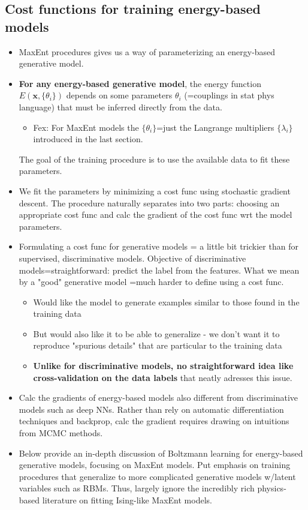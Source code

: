\documentclass[norsk,a4paper,11pt]{article}
\begin{document}
\subsection{Cost functions for training energy-based models}
\begin{itemize}
	\item MaxEnt procedures gives us a way of parameterizing an energy-based generative model.
	\item \textbf{For any energy-based generative model}, the energy function $E(\bm{x}, \{ \theta_i \})$ depends on some parameters $\theta_i$ (=couplings in stat phys language) that must be inferred directly from the data.
	\begin{itemize}
		\item Fex: For MaxEnt models the $\{ \theta_i \}$=just the Langrange multipliers $\{ \lambda_i \}$ introduced in the last section.
	\end{itemize}
	The goal of the training procedure is to use the available data to fit these parameters.
	\item We fit the parameters by minimizing a cost func using stochastic gradient descent. The procedure naturally separates into two parts: choosing an appropriate cost func and calc the gradient of the cost func wrt the model parameters. 
	\item Formulating a cost func for generative models = a little bit trickier than for supervised, discriminative models. Objective of discriminative models=straightforward: predict the label from the features. What we mean by a "good" generative model =much harder to define using a cost func. 
	\begin{itemize}
		\item Would like the model to generate examples similar to those found in the training data
		\item But would also like it to be able to generalize - we don't want it to reproduce "spurious details" that are particular to the training data
		\item \textbf{Unlike for discriminative models, no straightforward idea like cross-validation on the data labels} that neatly adresses this issue.
	\end{itemize}
	\item Calc the gradients of energy-based models also different from discriminative models such as deep NNs. Rather than rely on automatic differentiation techniques and backprop, calc the gradient requires drawing on intuitions from MCMC methods. 
	\item Below provide an in-depth discussion of Boltzmann learning for energy-based generative models, focusing on MaxEnt models. Put emphasis on training procedures that generalize to more complicated generative models w/latent variables such as RBMs. Thus, largely ignore the incredibly rich physics-based literature on fitting Ising-like MaxEnt models.
\end{itemize}
\end{document}
